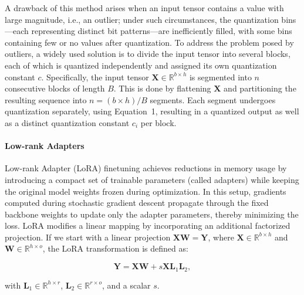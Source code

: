 A drawback of this method arises when an input tensor contains a value with large magnitude, i.e., an outlier; under such circumstances, the quantization bins—each representing distinct bit patterns—are inefficiently filled, with some bins containing few or no values after quantization. To address the problem posed by outliers, a widely used solution is to divide the input tensor into several blocks, each of which is quantized independently and assigned its own quantization constant $c$. Specifically, the input tensor $\mathbf{X}\in \mathbb{R}^{b\times h}$ is segmented into $n$ consecutive blocks of length $B$. This is done by flattening $\mathbf{X}$ and partitioning the resulting sequence into $n = ({b\times h})/{B}$ segments. Each segment undergoes quantization separately, using Equation~1, resulting in a quantized output as well as a distinct quantization constant $c_i$ per block.

\paragraph{Low-rank Adapters} Low-rank Adapter (LoRA) finetuning \citep{hu2021lora} achieves reductions in memory usage by introducing a compact set of trainable parameters (called adapters) while keeping the original model weights frozen during optimization. In this setup, gradients computed during stochastic gradient descent propagate through the fixed backbone weights to update only the adapter parameters, thereby minimizing the loss. LoRA modifies a linear mapping by incorporating an additional factorized projection. If we start with a linear projection ${\mathbf{X} \mathbf{W} = \mathbf{Y}}$, where $\mathbf{X}\in  \mathbb{R}^{b\times h}$ and $\mathbf{W}\in  \mathbb{R}^{h\times o}$, the LoRA transformation is defined as:

\begin{equation}
    \mathbf{Y} = \mathbf{X}\mathbf{W} + s\mathbf{X}\mathbf{L}_1\mathbf{L}_2,
\end{equation}

with $\mathbf{L}_1\in  \mathbb{R}^{h\times r}$, $\mathbf{L}_2\in  \mathbb{R}^{r\times o}$, and a scalar $s$.

